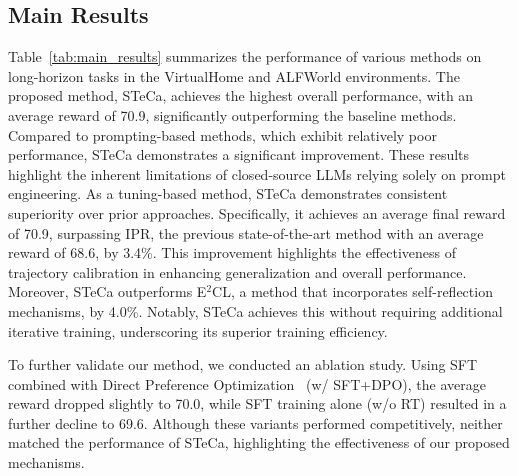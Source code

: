 \subsection{Main Results}
Table~\ref{tab:main_results} summarizes the performance of various methods on long-horizon tasks in the VirtualHome and ALFWorld environments. The proposed method, STeCa, achieves the highest overall performance, with an average reward of 70.9, significantly outperforming the baseline methods.
Compared to prompting-based methods, which exhibit relatively poor performance, STeCa demonstrates a significant improvement.
These results highlight the inherent limitations of closed-source LLMs relying solely on prompt engineering.
As a tuning-based method, STeCa demonstrates consistent superiority over prior approaches. Specifically, it achieves an average final reward of 70.9, surpassing IPR, the previous state-of-the-art method with an average reward of 68.6, by 3.4\%. This improvement highlights the effectiveness of trajectory calibration in enhancing generalization and overall performance. Moreover, STeCa outperforms E$^2$CL, a method that incorporates self-reflection mechanisms, by 4.0\%. 
Notably, STeCa achieves this without requiring additional iterative training, underscoring its superior training efficiency.

To further validate our method, we conducted an ablation study. Using SFT combined with Direct Preference Optimization~\citep{rafailov2024direct} (w/ SFT+DPO), the average reward dropped slightly to 70.0, while SFT training alone (w/o RT) resulted in a further decline to 69.6. Although these variants performed competitively, neither matched the performance of STeCa, highlighting the effectiveness of our proposed mechanisms.

\begin{table}[t!]
    \centering
    \caption{Performance of SFT, IPR, and our \model with different base models on the ALFWorld dataset.}
    \label{tab:base model}
\end{table}

